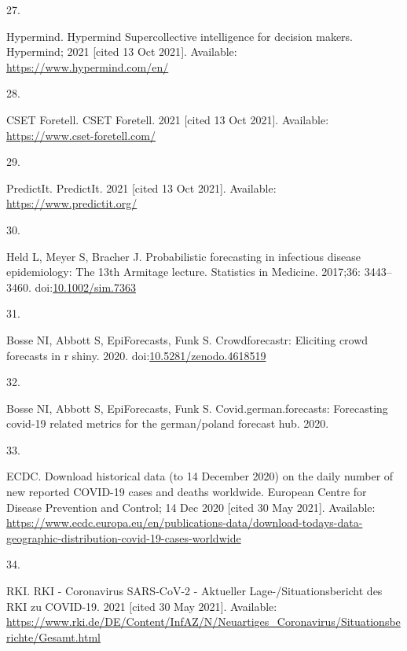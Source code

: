 \documentclass[10pt,letterpaper]{article}
\newlength{\cslhangindent}
\newlength{\csllabelwidth}
\newlength{\cslentryspacingunit} %
\newenvironment{CSLReferences}[2] %
 {%
  \setlength{\parindent}{0pt}
  \ifodd #1
  \let\oldpar\par
  \def\par{\hangindent=\cslhangindent\oldpar}
  \fi
  \setlength{\parskip}{#2\cslentryspacingunit}
 }%
 {}
\newcommand{\CSLLeftMargin}[1]{\parbox[t]{\csllabelwidth}{#1}}
\newcommand{\CSLRightInline}[1]{\parbox[t]{\linewidth - \csllabelwidth}{#1}\break}
\begin{document}
\begin{CSLReferences}{0}{0}
\leavevmode{}%
\CSLLeftMargin{27. }%
\CSLRightInline{Hypermind. Hypermind \textbar{} {Supercollective}
intelligence for decision makers. {Hypermind}; 2021 {[}cited 13 Oct
2021{]}. Available: \url{https://www.hypermind.com/en/}}

\leavevmode{}%
\CSLLeftMargin{28. }%
\CSLRightInline{CSET Foretell. {CSET Foretell}. 2021 {[}cited 13 Oct
2021{]}. Available: \url{https://www.cset-foretell.com/}}

\leavevmode{}%
\CSLLeftMargin{29. }%
\CSLRightInline{PredictIt. {PredictIt}. 2021 {[}cited 13 Oct 2021{]}.
Available: \url{https://www.predictit.org/}}

\leavevmode{}%
\CSLLeftMargin{30. }%
\CSLRightInline{Held L, Meyer S, Bracher J. Probabilistic forecasting in
infectious disease epidemiology: The 13th {Armitage} lecture. Statistics
in Medicine. 2017;36: 3443--3460.
doi:\href{https://doi.org/10.1002/sim.7363}{10.1002/sim.7363}}

\leavevmode{}%
\CSLLeftMargin{31. }%
\CSLRightInline{Bosse NI, Abbott S, EpiForecasts, Funk S.
Crowdforecastr: Eliciting crowd forecasts in r shiny. 2020.
doi:\href{https://doi.org/10.5281/zenodo.4618519}{10.5281/zenodo.4618519}}

\leavevmode{}%
\CSLLeftMargin{32. }%
\CSLRightInline{Bosse NI, Abbott S, EpiForecasts, Funk S.
Covid.german.forecasts: Forecasting covid-19 related metrics for the
german/poland forecast hub. 2020. }

\leavevmode{}%
\CSLLeftMargin{33. }%
\CSLRightInline{ECDC. Download historical data (to 14 {December} 2020)
on the daily number of new reported {COVID-19} cases and deaths
worldwide. {European Centre for Disease Prevention and Control}; 14 Dec
2020 {[}cited 30 May 2021{]}. Available:
\url{https://www.ecdc.europa.eu/en/publications-data/download-todays-data-geographic-distribution-covid-19-cases-worldwide}}

\leavevmode{}%
\CSLLeftMargin{34. }%
\CSLRightInline{RKI. {RKI} - {Coronavirus SARS-CoV-2} - {Aktueller
Lage-}/{Situationsbericht} des {RKI} zu {COVID-19}. 2021 {[}cited 30 May
2021{]}. Available:
\url{https://www.rki.de/DE/Content/InfAZ/N/Neuartiges_Coronavirus/Situationsberichte/Gesamt.html}}


\end{CSLReferences}
\end{document}
